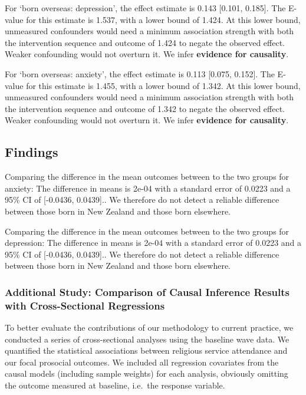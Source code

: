 \documentclass[
  single column]{article}
\begin{document}
For `born overseas: depression', the effect estimate is 0.143 {[}0.101,
0.185{]}. The E-value for this estimate is 1.537, with a lower bound of
1.424. At this lower bound, unmeasured confounders would need a minimum
association strength with both the intervention sequence and outcome of
1.424 to negate the observed effect. Weaker confounding would not
overturn it. We infer \textbf{evidence for causality}.

For `born overseas: anxiety', the effect estimate is 0.113 {[}0.075,
0.152{]}. The E-value for this estimate is 1.455, with a lower bound of
1.342. At this lower bound, unmeasured confounders would need a minimum
association strength with both the intervention sequence and outcome of
1.342 to negate the observed effect. Weaker confounding would not
overturn it. We infer \textbf{evidence for causality}.

\subsection{Findings}\label{findings}

Comparing the difference in the mean outcomes between to the two groups
for anxiety: The difference in means is 2e-04 with a standard error of
0.0223 and a 95\% CI of {[}-0.0436, 0.0439{]}.. We therefore do not
detect a reliable difference between those born in New Zealand and those
born elsewhere.

Comparing the difference in the mean outcomes between to the two groups
for depression: The difference in means is 2e-04 with a standard error
of 0.0223 and a 95\% CI of {[}-0.0436, 0.0439{]}.. We therefore do not
detect a reliable difference between those born in New Zealand and those
born elsewhere.

\newpage{}

\subsubsection{Additional Study: Comparison of Causal Inference Results
with Cross-Sectional
Regressions}\label{additional-study-comparison-of-causal-inference-results-with-cross-sectional-regressions}

To better evaluate the contributions of our methodology to current
practice, we conducted a series of cross-sectional analyses using the
baseline wave data. We quantified the statistical associations between
religious service attendance and our focal prosocial outcomes. We
included all regression covariates from the causal models (including
sample weights) for each analysis, obviously omitting the outcome
measured at baseline, i.e.~the response variable.
\end{document}
